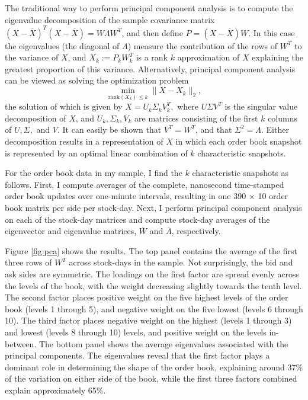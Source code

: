 	The traditional way to perform principal component analysis is to compute the eigenvalue decomposition of the sample covariance matrix $(X - \overline{X})^T(X - \overline{X}) = W \Lambda W^T$, and then define $P = (X - \overline{X})W$. In this case the eigenvalues (the diagonal of $\Lambda$) measure the contribution of the rows of $W^T$ to the variance of $X$, and $X_k := P_k W_k^T$ is a rank $k$ approximation of $X$ explaining the greatest proportion of this variance. Alternatively, principal component analysis can be viewed as solving the optimization problem $$ \min_{\text{rank}(X_k) \le k} \| X - X_k \|_2,$$ the solution of which is given by $X = U_k \Sigma_k V_k^T, $ where $U \Sigma V^T$ is the singular value decomposition of $X$, and $U_k, \Sigma_k, V_k$ are matrices consisting of the first $k$ columns of $U, \Sigma,$ and $V$. It can easily be shown that $V^T = W^T$, and that $\Sigma^2 = \Lambda$. Either decomposition results in a representation of $X$ in which each order book snapshot is represented by an optimal linear combination of $k$ characteristic snapshots.

	For the order book data in my sample, I find the $k$ characteristic snapshots as follows. First, I compute averages of the complete, nanosecond time-stamped order book updates over one-minute intervals, resulting in one 390 $\times$ 10 order book matrix per side per stock-day. Next, I perform principal component analysis on each of the stock-day matrices and compute stock-day averages of the eigenvector and eigenvalue matrices, $\overline{W}$ and $\overline{\Lambda}$, respectively.

	Figure \ref{fig:pca} shows the results. The top panel contains the average of the first three rows of $W^T$ across stock-days in the sample. Not surprisingly, the bid and ask sides are symmetric. The loadings on the first factor are spread evenly across the levels of the book, with the weight decreasing slightly towards the tenth level. The second factor places positive weight on the five highest levels of the order book (levels 1 through 5), and negative weight on the five lowest (levels 6 through 10). The third factor places negative weight on the highest (levels 1 through 3) and lowest (levels 8 through 10) levels, and positive weight on the levels in-between. The bottom panel shows the average eigenvalues associated with the principal components. The eigenvalues reveal that the first factor plays a dominant role in determining the shape of the order book, explaining around 37\% of the variation on either side of the book, while the first three factors combined explain approximately 65\%.

